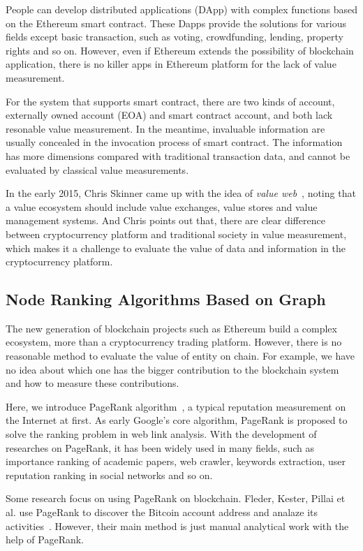 People can develop distributed applications (DApp) with complex functions based on the Ethereum smart contract. These Dapps provide the solutions for various fields except basic transaction, such as voting, crowdfunding, lending, property rights and so on.
However, even if Ethereum extends the possibility of blockchain application, there is no killer apps in Ethereum platform for the lack of value measurement.

For the system that supports smart contract, there are two kinds of account, externally owned account (EOA) and smart contract account, and both lack resonable value measurement. In the meantime, invaluable information are usually concealed in the invocation process of smart contract. The information has more dimensions compared with traditional transaction data, and cannot be evaluated by classical value measurements.

In the early 2015, Chris Skinner came up with the idea of \emph{value web}~\cite{ChrisSkinner}, noting that a value ecosystem should include value exchanges, value stores and value management systems. And Chris points out that, there are clear difference between cryptocurrency platform and traditional society in value measurement, which makes it a challenge to evaluate the value of data and information in the cryptocurrency platform.

\subsection{Node Ranking Algorithms Based on Graph}
The new generation of blockchain projects such as Ethereum build a complex ecosystem, more than a cryptocurrency trading platform. However, there is no reasonable method to evaluate the value of entity on chain. For example, we have no idea about which one has the bigger contribution to the blockchain system and how to measure these contributions.

Here, we introduce PageRank algorithm~\cite{page1999pagerank}, a typical reputation measurement on the Internet at first. As early Google's core algorithm, PageRank is proposed to solve the ranking problem in web link analysis. With the development of researches on PageRank, it has been widely used in many fields, such as importance ranking of academic papers, web crawler, keywords extraction, user reputation ranking in social networks and so on.

Some research focus on using PageRank on blockchain. Fleder, Kester, Pillai et al. use PageRank to discover the Bitcoin account address and analaze its activities~\cite{Fleder2015}. However, their main method is just manual analytical work with the help of PageRank.

